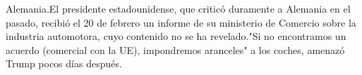 \documentclass{article}%
\begin{document}
Alemania.El presidente estadounidense, que criticó duramente a Alemania en el pasado, recibió el 20 de febrero un informe de su ministerio de Comercio sobre la industria automotora, cuyo contenido no se ha revelado."Si no encontramos un acuerdo (comercial con la UE), impondremos aranceles" a los coches, amenazó Trump pocos días después.%
\newline%
%
\end{document}
